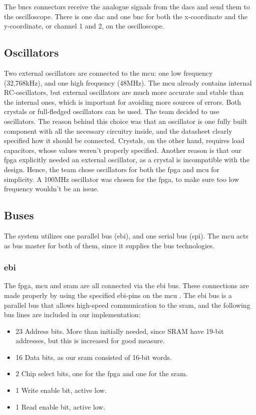 The \gls{bnc}s connectors receive the analogue signals from the \gls{dac}s and send them to the oscilloscope.
There is one \gls{dac} and one \gls{bnc} for both the x-coordinate and the y-coordinate, or channel 1 and 2, on the oscilloscope.

\subsection{Oscillators}
Two external oscillators are connected to the \gls{mcu}: one low frequency (32,768kHz), and one high frequency (48MHz).
The \gls{mcu} already contains internal RC-oscillators, but external oscillators are much more accurate and stable than the internal ones, which is important for avoiding more sources of errors.
Both crystals or full-fledged oscillators can be used. The team decided to use oscillators.
The reason behind this choice was that an oscillator is one fully built component with all the necessary circuitry inside, and the datasheet clearly specified how it should be connected.
Crystals, on the other hand, requires load capacitors, whose values weren't properly specified.
Another reason is that our \gls{fpga} explicitly needed an external oscillator, as a crystal is incompatible with the design.
Hence, the team chose oscillators for both the \gls{fpga} and \gls{mcu} for simplicity.
A 100MHz oscillator was chosen for the \gls{fpga}, to make sure too low frequency wouldn't be an issue.

\subsection{Buses}
The system utilizes one parallel bus (\gls{ebi}), and one serial bus (\gls{spi}).
The \gls{mcu} acts as bus master for both of them, since it supplies the bus technologies.

\subsubsection{\gls{ebi}}
The \gls{fpga}, \gls{mcu} and \gls{sram} are all connected via the \gls{ebi} bus.
These connections are made properly by using the specified \gls{ebi}-pins on the \gls{mcu} \cite[sec. 4.1]{efm32-datasheet}.
The \gls{ebi} bus is a parallel bus that allows high-speed communication to the \gls{sram}, and the following bus lines are included in our implementation:

\begin{itemize}
\item 23 Address bits. More than initially needed, since SRAM have 19-bit addresses, but this is increased for good measure.
\item 16 Data bits, as our \gls{sram} consisted of 16-bit words.
\item 2 Chip select bits, one for the \gls{fpga} and one for the \gls{sram}.
\item 1 Write enable bit, active low.
\item 1 Read enable bit, active low.
\end{itemize}

